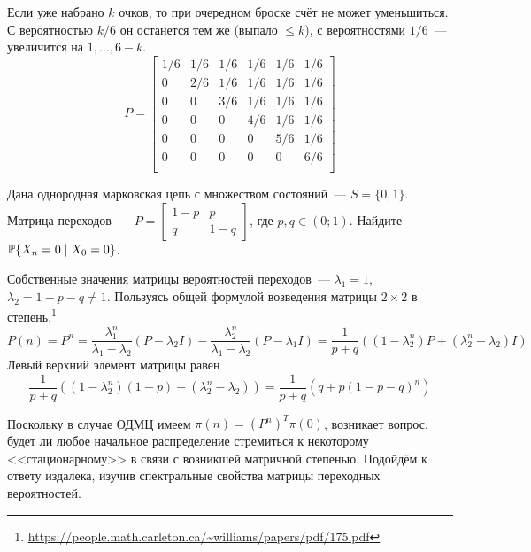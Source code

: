\begin{solution}
    Если уже набрано $ k $ очков, то при очередном броске счёт не может уменьшиться.
    С вероятностью $ k/6 $ он останется тем же (выпало $ \leqslant k $),
    с вероятностями $ 1/6 $~--- увеличится на $ 1, \ldots, 6-k $.
    \[
        P =
        \begin{bmatrix}
            1/6 & 1/6 & 1/6 & 1/6 & 1/6 & 1/6 \\
            0   & 2/6 & 1/6 & 1/6 & 1/6 & 1/6 \\
            0   & 0   & 3/6 & 1/6 & 1/6 & 1/6 \\
            0   & 0   & 0   & 4/6 & 1/6 & 1/6 \\
            0   & 0   & 0   & 0   & 5/6 & 1/6 \\
            0   & 0   & 0   & 0   & 0   & 6/6 \\
        \end{bmatrix}
    \]
\end{solution}

\begin{exercise}
    \label{exercise:markov:two_states_hdmc}
    Дана однородная марковская цепь с множеством состояний~--- $ S = \{0,1\} $.
    Матрица переходов~--- $ P = \begin{bmatrix} 1 - p & p \\ q & 1 - q \end{bmatrix} $,
    где $ p,q \in (0;1) $.
    Найдите $ \mathbb{P} \{ X_n = 0 \mid X_0 = 0 \} $.
\end{exercise}

\begin{solution}
    Собственные значения матрицы вероятностей переходов~--- $ \lambda_1 = 1 $, $ \lambda_2 = 1 - p - q \neq 1 $.
    Пользуясь общей формулой возведения матрицы $ 2 \times 2 $ в степень,\footnote{\url{https://people.math.carleton.ca/~williams/papers/pdf/175.pdf}}
    \[
        P(n) = P^n = \frac{\lambda_1^n}{\lambda_1 - \lambda_2}(P - \lambda_2 I) - \frac{\lambda_2^n}{\lambda_1 - \lambda_2}(P - \lambda_1 I) =
        \frac{1}{p + q} \left( (1 - \lambda_2^n) P + (\lambda_2^n - \lambda_2) I \right)
    \]
    Левый верхний элемент матрицы равен
    \[
        \frac{1}{p + q} \left( (1 - \lambda_2^n)(1 - p) + (\lambda_2^n - \lambda_2) \right) = \frac{1}{p + q}(q + p (1 - p - q)^n)
    \]
\end{solution}

Поскольку в случае ОДМЦ имеем $ \pi(n) = (P^n)^T \pi(0) $, возникает вопрос,
будет ли любое начальное распределение стремиться к некоторому <<стационарному>>
в связи с возникшей матричной степенью.
Подойдём к ответу издалека, изучив спектральные свойства матрицы переходных вероятностей.

